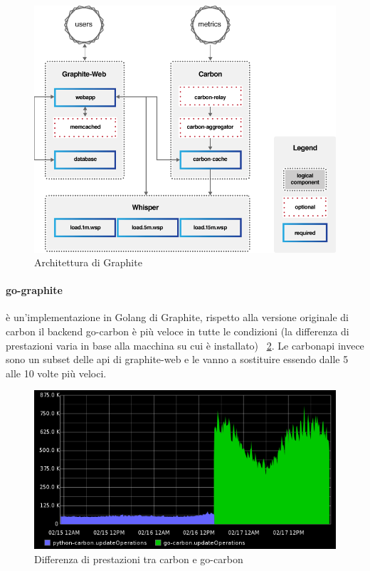\begin{figure}[h]
     \label{fig:graphite}
    \includegraphics[width=\hsize]{images/my_work/graphite.png}
    \caption{Architettura di Graphite}
    \centering
\end{figure}

\paragraph{go-graphite} è un'implementazione in Golang di Graphite, rispetto alla versione originale di carbon il backend
go-carbon è più veloce in tutte le condizioni (la differenza di prestazioni varia in base alla macchina su cui è installato) ~\ref{fig:gocarbon}.
Le carbonapi invece sono un subset delle api di graphite-web e le vanno a sostituire essendo dalle 5 alle 10 volte più veloci.

\begin{figure}[h]
    \label{fig:gocarbon}
    \includegraphics[width=\hsize]{images/my_work/go-carbon.png}
    \caption{Differenza di prestazioni tra carbon e go-carbon}
    \centering
\end{figure}


